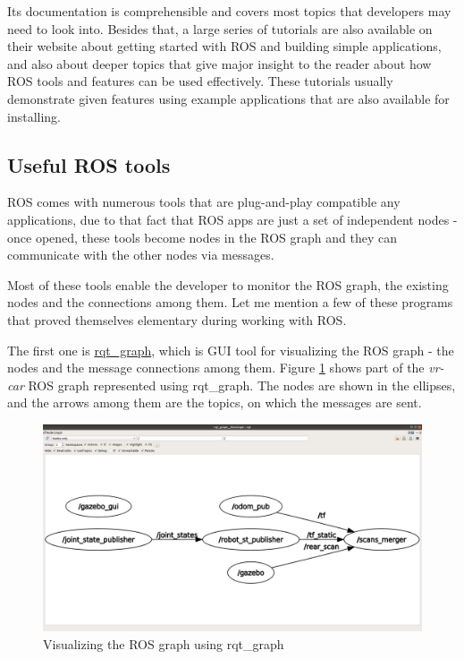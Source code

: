 Its documentation is comprehensible and covers most topics that developers may need to look into. Besides that, a large series of tutorials are also available on their website about getting started with ROS and building simple applications, and also about deeper topics that give major insight to the reader about how ROS tools and features can be used effectively. These tutorials usually demonstrate given features using example applications that are also available for installing.

\subsection{Useful ROS tools}
ROS comes with numerous tools that are plug-and-play compatible any applications, due to that fact that ROS apps are just a set of independent nodes - once opened, these tools become nodes in the ROS graph and they can communicate with the other nodes via messages.

Most of these tools enable the developer to monitor the ROS graph, the existing nodes and the connections among them. Let me mention a few of these programs that proved themselves elementary during working with ROS.

The first one is \href{http://wiki.ros.org/rqt_graph}{rqt\_graph}, which is GUI tool for visualizing the ROS graph - the nodes and the message connections among them. Figure \ref{rqt_graph} shows part of the \textit{vr-car} ROS graph represented using rqt\_graph. The nodes are shown in the ellipses, and the arrows among them are the topics, on which the messages are sent.

\begin{figure}[!ht]
	\centering
	\includegraphics[width=\textwidth]{figures/raw/rqt_graph.png}
	\caption{Visualizing the ROS graph using rqt\_graph}
	\label{rqt_graph}
\end{figure}

